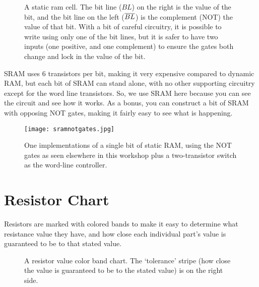 
\begin{figure}[h!]
\begin{center}

\caption{A static ram cell. The bit line ($BL$) on the right is the value of the bit, and the bit line on the left ($\overline{BL}$) is the complement (NOT) the value of that bit. With a bit of careful circuitry, it is possible to write using only one of the bit lines, but it is safer to have two inputs (one positive, and one complement) to ensure the gates both change and lock in the value of the bit. } 
\label{fig:sram}
\end{center}
\end{figure}

SRAM uses 6 transistors per bit, making it very expensive compared to dynamic RAM, but each bit of SRAM can stand alone, with no other supporting circuitry except for the word line transistors. So, we use SRAM here because you can see the circuit and see how it works. As a bonus, you can construct a bit of SRAM with opposing NOT gates, making it fairly easy to see what is happening.

\begin{figure}[!hb]
\begin{center}
\texttt{[image: sramnotgates.jpg]}
\medskip
\caption{One implementations of a single bit of static RAM, using the NOT gates as seen elsewhere in this workshop plus a two-transistor switch as the word-line controller.}
\label{fig:srambreadboard}
\end{center}
\end{figure}


\clearpage


\section*{Resistor Chart}

Resistors are marked with colored bands to make it easy to determine what resistance value they have, and how close each individual part's value is guaranteed to be to that stated value.


\begin{figure}[!ht]
\begin{center}
\caption{A resistor value color band chart. The `tolerance' stripe (how close the value is guaranteed to be to the stated value) is on the right side. }
\label{fig:resistorchart}
\end{center}
\end{figure}
